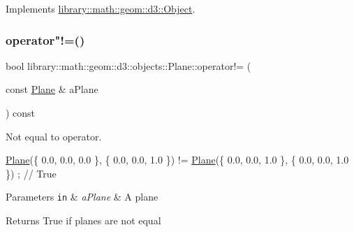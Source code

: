 Implements \hyperlink{classlibrary_1_1math_1_1geom_1_1d3_1_1_object_a2216442e322f0c3ca5f01a4efa22baf7}{library\+::math\+::geom\+::d3\+::\+Object}.

\mbox{\label{classlibrary_1_1math_1_1geom_1_1d3_1_1objects_1_1_plane_a5dfafb90b0da2cc239092ea6c655ec2a}} 
\subsubsection{\texorpdfstring{operator"!=()}{operator!=()}}
{\footnotesize\ttfamily bool library\+::math\+::geom\+::d3\+::objects\+::\+Plane\+::operator!= (\begin{DoxyParamCaption}\item[{const \hyperlink{classlibrary_1_1math_1_1geom_1_1d3_1_1objects_1_1_plane}{Plane} \&}]{a\+Plane }\end{DoxyParamCaption}) const}



Not equal to operator. 


\begin{DoxyCode}
\hyperlink{classlibrary_1_1math_1_1geom_1_1d3_1_1objects_1_1_plane_a81fe78a983e2cb6ee6ad9bfabd22c3a4}{Plane}(\{ 0.0, 0.0, 0.0 \}, \{ 0.0, 0.0, 1.0 \}) != \hyperlink{classlibrary_1_1math_1_1geom_1_1d3_1_1objects_1_1_plane_a81fe78a983e2cb6ee6ad9bfabd22c3a4}{Plane}(\{ 0.0, 0.0, 1.0 \}, \{ 0.0, 0.0, 1.0 \}) ; \textcolor{comment}{//
       True}
\end{DoxyCode}



\begin{DoxyParams}[1]{Parameters}
\mbox{\tt in}  & {\em a\+Plane} & A plane \\
\hline
\end{DoxyParams}
\begin{DoxyReturn}{Returns}
True if planes are not equal 
\end{DoxyReturn}
\mbox{\label{classlibrary_1_1math_1_1geom_1_1d3_1_1objects_1_1_plane_a9391589825cac1db971b39452b38f8ea}} 
